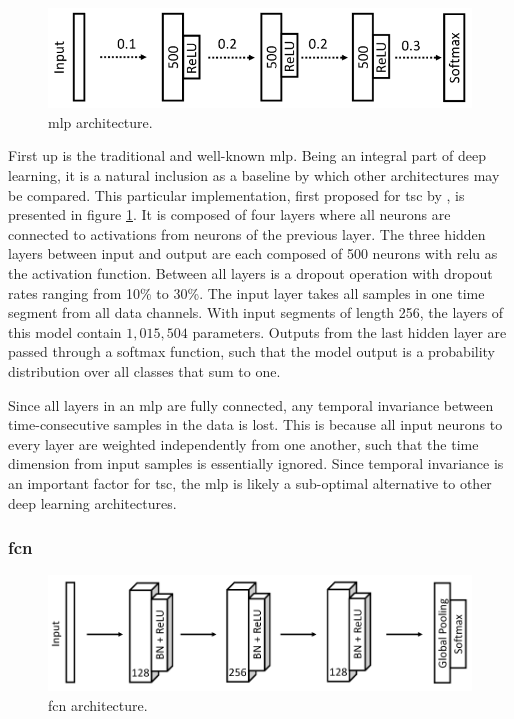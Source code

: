 \begin{figure}[h]
    \centering
    \includegraphics[width=\textwidth]{figures/impl_MLP.png}
    \caption{\acrlong{mlp} architecture.}
    \label{fig:impl_MLP}
\end{figure}

First up is the traditional and well-known \acrfull{mlp}. Being an integral part of deep learning, it is a natural inclusion as a baseline by which other architectures may be compared. This particular implementation, first proposed for \acrshort{tsc} by \textcite{wang2016}, is presented in figure \ref{fig:impl_MLP}. It is composed of four layers where all neurons are connected to activations from neurons of the previous layer. The three hidden layers between input and output are each composed of 500 neurons with \acrshort{relu} as the activation function. Between all layers is a dropout operation with dropout rates ranging from 10\% to 30\%. The input layer takes all samples in one time segment from all data channels. With input segments of length 256, the layers of this model contain $1,015,504$ parameters. Outputs from the last hidden layer are passed through a softmax function, such that the model output is a probability distribution over all classes that sum to one.

Since all layers in an \acrshort{mlp} are fully connected, any temporal invariance between time-consecutive samples in the data is lost. This is because all input neurons to every layer are weighted independently from one another, such that the time dimension from input samples is essentially ignored. Since temporal invariance is an important factor for \acrshort{tsc}, the \acrshort{mlp} is likely a sub-optimal alternative to other deep learning architectures. 

\newpage
\subsubsection{\acrlong{fcn}}

\begin{figure}[h]
    \centering
    \includegraphics[width=\textwidth]{figures/impl_FCN.png}
    \caption{\acrlong{fcn} architecture.}
    \label{fig:impl_FCN}
\end{figure}

